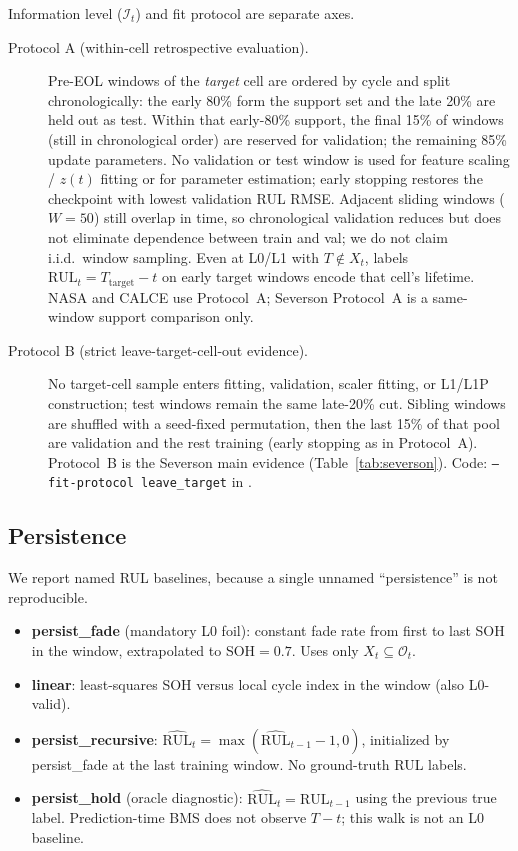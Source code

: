 \documentclass[preprint,12pt]{elsarticle}
\begin{document}
Information level ($\mathcal{I}_t$) and fit protocol are separate axes.
\begin{description}
\item[Protocol A (within-cell retrospective evaluation).]
Pre-EOL windows of the \emph{target} cell are ordered by cycle and split chronologically: the early 80\% form the support set and the late 20\% are held out as test.
Within that early-80\% support, the final 15\% of windows (still in chronological order) are reserved for validation; the remaining 85\% update parameters.
No validation or test window is used for feature scaling / $z(t)$ fitting or for parameter estimation; early stopping restores the checkpoint with lowest validation RUL RMSE.
Adjacent sliding windows ($W{=}50$) still overlap in time, so chronological validation reduces but does not eliminate dependence between train and val; we do not claim i.i.d.\ window sampling.
Even at L0/L1 with $T\notin X_t$, labels $\mathrm{RUL}_t=T_{\mathrm{target}}-t$ on early target windows encode that cell's lifetime.
NASA and CALCE use Protocol~A; Severson Protocol~A is a same-window support comparison only.
\item[Protocol B (strict leave-target-cell-out evidence).]
No target-cell sample enters fitting, validation, scaler fitting, or L1/L1P construction; test windows remain the same late-20\% cut.
Sibling windows are shuffled with a seed-fixed permutation, then the last 15\% of that pool are validation and the rest training (early stopping as in Protocol~A).
Protocol~B is the Severson main evidence (Table~\ref{tab:severson}).
Code: \texttt{--fit-protocol leave\_target} in .
\end{description}

\subsection{Persistence}
\label{sec:persist}

We report named RUL baselines, because a single unnamed “persistence” is not reproducible.
\begin{itemize}
\item \textbf{persist\_fade} (mandatory L0 foil): constant fade rate from first to last SOH in the window, extrapolated to SOH$=0.7$. Uses only $X_t\subseteq\mathcal{O}_t$.
\item \textbf{linear}: least-squares SOH versus local cycle index in the window (also L0-valid).
\item \textbf{persist\_recursive}: $\widehat{\mathrm{RUL}}_t=\max(\widehat{\mathrm{RUL}}_{t-1}-1,0)$, initialized by persist\_fade at the last training window. No ground-truth RUL labels.
\item \textbf{persist\_hold} (oracle diagnostic): $\widehat{\mathrm{RUL}}_t=\mathrm{RUL}_{t-1}$ using the previous true label. Prediction-time BMS does not observe $T-t$; this walk is not an L0 baseline.
\end{itemize}
\end{document}
